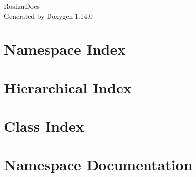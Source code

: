 \documentclass[twoside]{book}
\newcommand{\+}{\discretionary{\mbox{\scriptsize$\hookleftarrow$}}{}{}}
\newcommand{\clearemptydoublepage}{%
    \newpage{\pagestyle{empty}\cleardoublepage}%
  }
\begin{document}
  \raggedbottom
    \hypersetup{pageanchor=false,
                bookmarksnumbered=true,
                pdfencoding=unicode
               }
  \begin{titlepage}
  \vspace*{7cm}
  \begin{center}%
  {\Large Roshar\+Docs}\\
  \vspace*{1cm}
  {\large Generated by Doxygen 1.14.0}\\
  \end{center}
  \end{titlepage}
  \clearemptydoublepage
  \tableofcontents
  \clearemptydoublepage
  \hypersetup{pageanchor=true}
\chapter{Namespace Index}

\chapter{Hierarchical Index}

\chapter{Class Index}

\chapter{Namespace Documentation}

\end{document}
